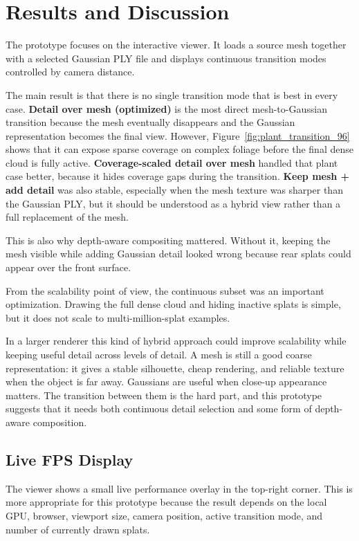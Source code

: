\documentclass{egpubl}
\begin{document}
\section{Results and Discussion}

The prototype focuses on the interactive viewer. It loads a source mesh together with a selected Gaussian PLY file
and displays continuous transition modes controlled by camera distance.

The main result is that there is no single transition mode that is best in every case.
\textbf{Detail over mesh (optimized)} is the most direct mesh-to-Gaussian transition because the mesh eventually disappears
and the Gaussian representation becomes the final view. However, Figure~\ref{fig:plant_transition_96} shows that it can expose
sparse coverage on complex foliage before the final dense cloud is fully active.
\textbf{Coverage-scaled detail over mesh} handled that plant case better, because it hides coverage gaps during the transition.
\textbf{Keep mesh + add detail} was also stable, especially when the mesh texture was sharper than the Gaussian PLY,
but it should be understood as a hybrid view rather than a full replacement of the mesh.

This is also why depth-aware compositing mattered. Without it, keeping the mesh visible while adding Gaussian detail
looked wrong because rear splats could appear over the front surface.

From the scalability point of view, the continuous subset was an important optimization.
Drawing the full dense cloud and hiding inactive splats is simple, but it does not scale to multi-million-splat examples.

In a larger renderer this kind of hybrid approach could improve scalability while keeping useful detail across levels of detail.
A mesh is still a good coarse representation: it gives a stable silhouette, cheap rendering, and reliable texture when the
object is far away. Gaussians are useful when close-up appearance matters. The transition between them is the hard part,
and this prototype suggests that it needs both continuous detail selection and some form of depth-aware composition.

\subsection{Live FPS Display}

The viewer shows a small live performance overlay in the top-right corner.
This is more appropriate for this prototype because the result depends on the local GPU, browser, viewport size, camera position,
active transition mode, and number of currently drawn splats.
\end{document}
